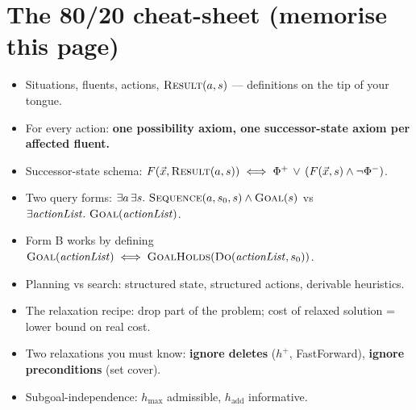 \documentclass[11pt,a4paper]{article}
\newcommand{\pred}[1]{\textsc{#1}}
\newcommand{\Result}{\pred{Result}}
\begin{document}
\hrulefill

\section*{The 80/20 cheat-sheet (memorise this page)}

\begin{tray}
\begin{itemize}[leftmargin=*,itemsep=0pt]
  \item Situations, fluents, actions, $\Result(a,s)$ --- definitions on the tip of your tongue.
  \item For every action: \textbf{one possibility axiom, one successor-state axiom per affected fluent.}
  \item Successor-state schema: $F(\vec{x}, \Result(a, s)) \iff \Phi^+\,\vee\,(F(\vec{x},s) \wedge \neg \Phi^-)$.
  \item Two query forms: $\exists a\,\exists s.\ \pred{Sequence}(a,s_0,s) \wedge \pred{Goal}(s)$ vs $\exists \mathit{actionList}.\ \pred{Goal}(\mathit{actionList})$.
  \item Form B works by defining $\pred{Goal}(\mathit{actionList}) \iff \pred{GoalHolds}(\pred{Do}(\mathit{actionList}, s_0))$.
\end{itemize}
\end{tray}

\begin{tray}
\begin{itemize}[leftmargin=*,itemsep=0pt]
  \item Planning vs search: structured state, structured actions, derivable heuristics.
  \item The relaxation recipe: drop part of the problem; cost of relaxed solution = lower bound on real cost.
  \item Two relaxations you must know: \textbf{ignore deletes} ($h^+$, FastForward), \textbf{ignore preconditions} (set cover).
  \item Subgoal-independence: $h_{\max}$ admissible, $h_{\text{add}}$ informative.
\end{itemize}
\end{tray}
\end{document}
